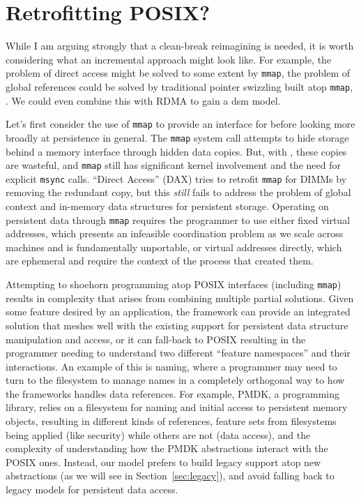 \section{Retrofitting POSIX?}

While I am arguing strongly that a clean-break reimagining is needed, it is worth considering what an incremental
approach might look like. For example, the problem of direct access might be solved to some extent by \texttt{mmap}, the
problem of global references could be solved by traditional pointer swizzling built atop \texttt{mmap}, \etc. We could
even combine this with RDMA to gain a \ac{dsm} model.

Let's first consider the use of \texttt{mmap} to provide an interface for \NVM before looking more broadly at
persistence in general.
The \texttt{mmap} system call attempts to hide storage behind a memory interface through hidden
data copies. But, with \NVM, these copies are wasteful, and \texttt{mmap} still has significant kernel
involvement and the need for explicit \texttt{msync} calls. ``Direct Access'' (DAX)
tries to retrofit \texttt{mmap} for \NVM DIMMs by removing the redundant copy, but this \emph{still}
fails to address the problem of global context and in-memory data structures for persistent storage.
Operating on persistent data through \texttt{mmap} requires the programmer to
use either fixed virtual addresses, which presents an infeasible coordination problem
as we scale across machines and is fundamentally unportable, or virtual addresses directly, which are ephemeral and require the
context of the process that created them.

Attempting to shoehorn \NVM programming atop POSIX interfaces (including \texttt{mmap}) results in
complexity that arises from combining multiple partial solutions. Given some feature desired by an
application, the \NVM framework can provide an integrated solution that meshes
well with the existing support for persistent data structure manipulation and access, or it can
fall-back to POSIX resulting in the programmer needing to understand two different ``feature
namespaces'' and their interactions. An example of this is naming, where a programmer may need
to turn to the filesystem to manage names in a completely orthogonal way to how the \NVM frameworks handles
data references. For example, PMDK, a \NVM programming library, relies on a filesystem for naming and initial access to
persistent memory objects, resulting in different kinds of references, feature sets from filesystems
being applied (like security) while others are not (data access), and the complexity of
understanding how the PMDK abstractions interact with the POSIX ones. Instead, our model prefers to
build legacy support atop new abstractions (as we will see in Section~\ref{sec:legacy}), and avoid falling back to legacy
models for persistent data access.

